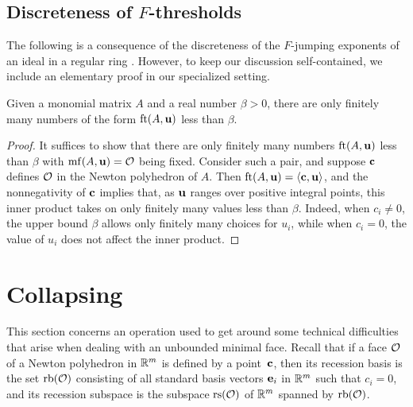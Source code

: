 \documentclass[11pt]{amsart}
\begin{document}
\subsection{Discreteness of $F$-thresholds}

The following is a consequence of the discreteness of the $F$-jumping exponents of an ideal in a regular ring \cite[Theorem~3.1]{blickle+mustata+smith.discr_rat_FPTs}.
However, to keep our discussion self-contained, we include an elementary proof in our specialized setting.

\begin{proposition}
\label{discreteness: P}
Given a monomial matrix $A$ and a real number $\beta > 0 $, there are only finitely many numbers of the form $\operatorname{ft}(A, \mathbf{u})$ less than $\beta$.
\end{proposition}

\begin{proof}
   It suffices to show that there are only finitely many numbers $\operatorname{ft}(A, \mathbf{u})$ less than $\beta$ with $\operatorname{mf}(A, \mathbf{u}) = \mathcal{O}$ being fixed.
   Consider such a pair, and suppose $\mathbf{c}$ defines $\mathcal{O}$ in the Newton polyhedron of $A$.
   Then $\operatorname{ft}(A, \mathbf{u}) = \langle \mathbf{c}, \mathbf{u} \rangle$, and the nonnegativity of $\mathbf{c}$ implies that, as $\mathbf{u}$ ranges over positive integral points, this inner product takes on only finitely many values less than $\beta$.
   Indeed, when $c_i \ne 0$, the upper bound $\beta$ allows only finitely many choices for $u_i$, while when $c_i = 0$, the value of $u_i$ does not affect the inner product.
\end{proof}


\newpage
\section{Collapsing}

This section concerns an operation used to get around some technical difficulties that arise when dealing with an unbounded minimal face.
Recall that if a face $\mathcal{O}$ of a Newton polyhedron in $\mathbb{R}^m$ is defined by a point~$\mathbf{c}$, then its recession basis is the set $\operatorname{rb}(\mathcal{O})$ consisting of all standard basis vectors $\mathbf{e}_i$ in $\mathbb{R}^m$ such that $c_i = 0$, and its recession subspace is the subspace $\operatorname{rs}(\mathcal{O})$ of $\mathbb{R}^m$ spanned by $\operatorname{rb}(\mathcal{O})$.
\end{document}
